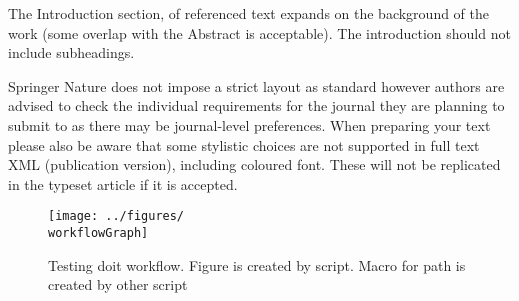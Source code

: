 The Introduction section, of referenced text \cite{bib1} expands on the background of the work (some overlap with the Abstract is acceptable). The introduction should not include subheadings.

Springer Nature does not impose a strict layout as standard however authors are advised to check the individual requirements for the journal they are planning to submit to as there may be journal-level preferences. When preparing your text please also be aware that some stylistic choices are not supported in full text XML (publication version), including coloured font. These will not be replicated in the typeset article if it is accepted. 

\begin{figure}[h]%
	\centering
	\texttt{[image: ../figures/\\workflowGraph]}
	\caption{Testing doit workflow. Figure is created by script. Macro for path is created by other script}\label{fig:workflow}
\end{figure}